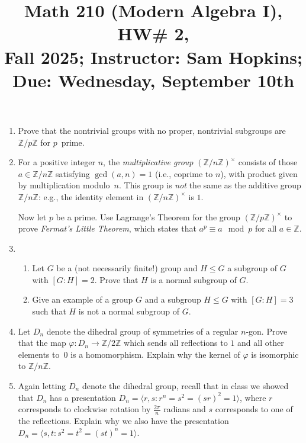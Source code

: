 \documentclass[11pt]{article}
\title{Math 210 (Modern Algebra I), HW\# 2, \\ {\normalsize Fall 2025; Instructor: Sam Hopkins; Due: Wednesday, September 10th}}
\date{}
\begin{document}
\maketitle

\thispagestyle{empty}
\begin{enumerate}

\item Prove that the nontrivial groups with no proper, nontrivial subgroups are $\mathbb{Z}/p\mathbb{Z}$ for $p$~prime.

\item For a positive integer $n$, the \emph{multiplicative group} $(\mathbb{Z}/n\mathbb{Z})^\times$ consists of those $a\in \mathbb{Z}/n\mathbb{Z}$ satisfying $\gcd(a,n)=1$ (i.e., coprime to $n$), with product given by multiplication modulo~$n$. This group is \emph{not} the same as the additive group $\mathbb{Z}/n\mathbb{Z}$: e.g., the identity element in $(\mathbb{Z}/n\mathbb{Z})^\times$ is $1$.

Now let $p$ be a prime. Use Lagrange's Theorem for the group $(\mathbb{Z}/p\mathbb{Z})^\times$ to prove \emph{Fermat's Little Theorem}, which states that $a^p \equiv a \mod p$ for all $a\in \mathbb{Z}$.

\item \begin{enumerate}
\item Let $G$ be a (not necessarily finite!) group and $H \leq G$ a subgroup of $G$ with $[G:H]=2$. Prove that $H$ is a normal subgroup of $G$.

\item Give an example of a group $G$ and a subgroup $H \leq G$ with $[G:H]=3$ such that $H$ is not a normal subgroup of $G$.
\end{enumerate}

\item Let $D_n$ denote the dihedral group of symmetries of a regular $n$-gon. Prove that the map $\varphi\colon D_n \to \mathbb{Z}/2\mathbb{Z}$ which sends all reflections to $1$ and all other elements to~$0$ is a homomorphism. Explain why the kernel of $\varphi$ is isomorphic to $\mathbb{Z}/n\mathbb{Z}$.

\item Again letting $D_n$ denote the dihedral group, recall that in class we showed that $D_n$ has a presentation $D_n = \langle r,s \colon r^n = s^2 = (sr)^2=1\rangle$, where $r$ corresponds to clockwise rotation by $\frac{2\pi}{n}$ radians and $s$ corresponds to one of the reflections. Explain why we also have the presentation $D_n = \langle s,t \colon s^2 = t^2 = (st)^n = 1\rangle$.



\end{enumerate}
\end{document}
